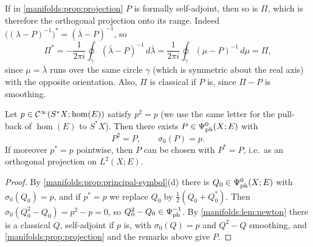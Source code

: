 If in \cref{manifolds:prop:projection} $P$ is formally self-adjoint, then so is $\Pi$,
which is therefore the orthogonal projection onto its range. Indeed
$\big((\lambda-P)^{-1}\big)^*=(\bar\lambda-P)^{-1}$, so
\begin{equation*}
\Pi^*=-\frac1{2\pi i}\oint_\gamma(\bar\lambda-P)^{-1}\,d\bar\lambda
=\frac1{2\pi i}\oint_\gamma(\mu-P)^{-1}\,d\mu=\Pi ,
\end{equation*}
since $\mu=\bar\lambda$ runs over the same circle $\gamma$ (which is symmetric about the
real axis) with the opposite orientation. Also, $\Pi$ is classical if $P$ is, since
$\Pi-P$ is smoothing.

\begin{theorem}\label{manifolds:thm:projection-symbol}
Let $p\in\mathcal{C}^\infty(S^*X;\hom(E))$ satisfy $p^2=p$ (we use the same letter for the pull-back
of $\hom(E)$ to $S^*X$). Then there exists $P\in\Psi^{0}_{\mathrm{ph}}(X;E)$ with
\begin{equation*}
P^2=P,\qquad \sigma_0(P)=p .
\end{equation*}
If moreover $p^*=p$ pointwise, then $P$ can be chosen with $P^*=P$, i.e.\ as an
orthogonal projection on $L^2(X;E)$.
\end{theorem}
\begin{proof}
By \cref{manifolds:prop:principal-symbol}(d) there is $Q_0\in\Psi^{0}_{\mathrm{ph}}(X;E)$ with
$\sigma_0(Q_0)=p$, and if $p^*=p$ we replace $Q_0$ by $\frac12(Q_0+Q_0^*)$. Then
$\sigma_0(Q_0^2-Q_0)=p^2-p=0$, so $Q_0^2-Q_0\in\Psi^{-1}_{\mathrm{ph}}$. By
\cref{manifolds:lem:newton} there is a classical $Q$, self-adjoint if $p$ is, with
$\sigma_0(Q)=p$ and $Q^2-Q$ smoothing, and \cref{manifolds:prop:projection} and the
remarks above give $P$.
\end{proof}

